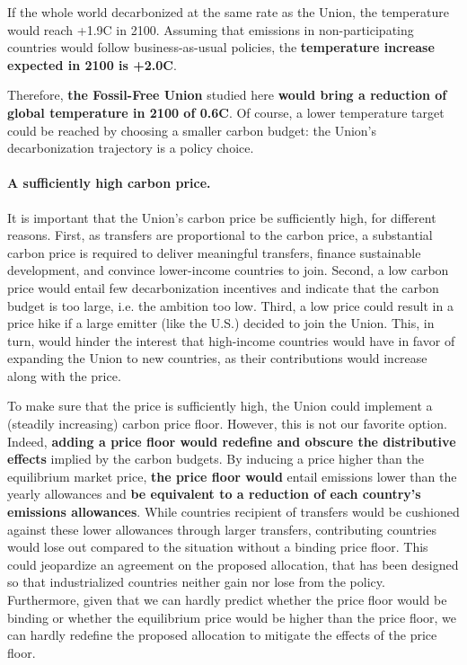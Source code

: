 \documentclass[12pt,english]{article}
\begin{document}
If the whole world decarbonized at the same rate as the Union, the temperature would reach +1.9\textdegree{}C in 2100. Assuming that emissions in non-participating countries would follow business-as-usual policies, %
the \textbf{temperature increase expected in 2100 is +2.0\textdegree{}C}. 

Therefore, \textbf{the Fossil-Free Union} studied here \textbf{would bring a reduction of global temperature in 2100 of 0.6\textdegree{}C}. Of course, a lower temperature target could be reached by choosing a smaller carbon budget: the Union's decarbonization trajectory is a policy choice. %

\paragraph{A sufficiently high carbon price.}
It is important that the Union's carbon price be sufficiently high, for different reasons. First, as transfers are proportional to the carbon price, a substantial carbon price is required to deliver meaningful transfers, finance sustainable development, and convince lower-income countries to join. Second, a low carbon price would entail few decarbonization incentives and indicate that the carbon budget is too large, i.e. the ambition too low. Third, a low price could result in a price hike if a large emitter (like the U.S.) decided to join the Union. This, in turn, would hinder the interest that high-income countries would have in favor of expanding the Union to new countries, as their contributions would increase along with the price.

To make sure that the price is sufficiently high, the Union could implement a (steadily increasing) carbon price floor. However, this is not our favorite option. Indeed, \textbf{adding a price floor would redefine and obscure the distributive effects} implied by the carbon budgets. By inducing a price higher than the equilibrium market price, \textbf{the price floor would} entail emissions lower than the yearly allowances and \textbf{be equivalent to a reduction of each country's emissions allowances}. While countries recipient of transfers would be cushioned against these lower allowances through larger transfers, contributing countries would lose out compared to the situation without a binding price floor. This could jeopardize an agreement on the proposed allocation, that has been designed so that industrialized countries %
neither gain nor 
lose from the policy. 
Furthermore, given that we can hardly predict whether the price floor would be binding or whether the equilibrium price would be higher than the price floor, we can hardly redefine the proposed allocation to mitigate the effects of the price floor.
\end{document}
